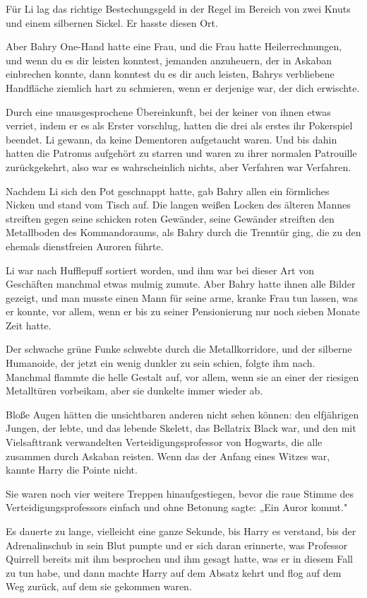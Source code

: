 {Für Li lag das richtige Bestechungsgeld in der Regel im Bereich von zwei Knuts und einem silbernen Sickel. Er hasste diesen Ort.

Aber Bahry One-Hand hatte eine Frau, und die Frau hatte Heilerrechnungen, und wenn du es dir leisten konntest, jemanden anzuheuern, der in Askaban einbrechen konnte, dann konntest du es dir auch leisten, Bahrys verbliebene Handfläche ziemlich hart zu schmieren, wenn er derjenige war, der dich erwischte.

Durch eine unausgesprochene Übereinkunft, bei der keiner von ihnen etwas verriet, indem er es als Erster vorschlug, hatten die drei als erstes ihr Pokerspiel beendet. Li gewann, da keine Dementoren aufgetaucht waren. Und bis dahin hatten die Patronus aufgehört zu starren und waren zu ihrer normalen Patrouille zurückgekehrt, also war es wahrscheinlich nichts, aber Verfahren war Verfahren.

Nachdem Li sich den Pot geschnappt hatte, gab Bahry allen ein förmliches Nicken und stand vom Tisch auf. Die langen weißen Locken des älteren Mannes streiften gegen seine schicken roten Gewänder, seine Gewänder streiften den Metallboden des Kommandoraums, als Bahry durch die Trenntür ging, die zu den ehemals dienstfreien Auroren führte.

Li war nach Hufflepuff sortiert worden, und ihm war bei dieser Art von Geschäften manchmal etwas mulmig zumute. Aber Bahry hatte ihnen alle Bilder gezeigt, und man musste einen Mann für seine arme, kranke Frau tun lassen, was er konnte, vor allem, wenn er bis zu seiner Pensionierung nur noch sieben Monate Zeit hatte.

Der schwache grüne Funke schwebte durch die Metallkorridore, und der silberne Humanoide, der jetzt ein wenig dunkler zu sein schien, folgte ihm nach. Manchmal flammte die helle Gestalt auf, vor allem, wenn sie an einer der riesigen Metalltüren vorbeikam, aber sie dunkelte immer wieder ab.

Bloße Augen hätten die unsichtbaren anderen nicht sehen können: den elfjährigen Jungen, der lebte, und das lebende Skelett, das Bellatrix Black war, und den mit Vielsafttrank verwandelten Verteidigungsprofessor von Hogwarts, die alle zusammen durch Askaban reisten. Wenn das der Anfang eines Witzes war, kannte Harry die Pointe nicht.

Sie waren noch vier weitere Treppen hinaufgestiegen, bevor die raue Stimme des Verteidigungsprofessors einfach und ohne Betonung sagte: „Ein Auror kommt."

Es dauerte zu lange, vielleicht eine ganze Sekunde, bis Harry es verstand, bis der Adrenalinschub in sein Blut pumpte und er sich daran erinnerte, was Professor Quirrell bereits mit ihm besprochen und ihm gesagt hatte, was er in diesem Fall zu tun habe, und dann machte Harry auf dem Absatz kehrt und flog auf dem Weg zurück, auf dem sie gekommen waren.

}

